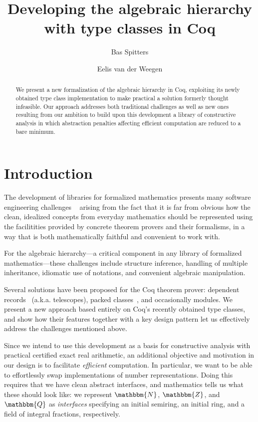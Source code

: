 \documentclass{llncs}
\newcommand{\N}{\ensuremath{\mathbbm{N}}}
\newcommand{\Z}{\ensuremath{\mathbbm{Z}}}
\newcommand{\Q}{\ensuremath{\mathbbm{Q}}}
\begin{document}
\title{Developing the algebraic hierarchy with type classes in Coq}
\author{Bas Spitters \and Eelis van der Weegen}
\maketitle
\begin{abstract}
We present a new formalization of the algebraic hierarchy in Coq, exploiting its newly obtained type class implementation to make practical a solution formerly thought infeasible. Our approach addresses both traditional challenges as well as new ones resulting from our ambition to build upon this development a library of constructive analysis in which abstraction penalties affecting efficient computation are reduced to a bare minimum.
\end{abstract}

\section{Introduction}
The development of libraries for formalized mathematics presents many software engineering challenges ~\cite{C-corn,DBLP:conf/types/HaftmannW08} arising from the fact that it is far from obvious how the clean, idealized concepts from everyday mathematics should be represented using the facilitities provided by concrete theorem provers and their formalisms, in a way that is both mathematically faithful and convenient to work with.

For the algebraic hierarchy---a critical component in any library of formalized mathematics---these challenges include structure inference, handling of multiple inheritance, idiomatic use of notations, and convenient algebraic manipulation.

Several solutions have been proposed for the Coq theorem prover: dependent records~\cite{DBLP:journals/jsc/GeuversPWZ02} (a.k.a. telescopes), packed classes~\cite{Packed}, and occasionally modules. We present a new approach based entirely on Coq's recently obtained type classes, and show how their features together with a key design pattern let us effectively address the challenges mentioned above.

Since we intend to use this development as a basis for constructive analysis with practical certified exact real arithmetic, an additional objective and motivation in our design is to facilitate \emph{efficient} computation. In particular, we want to be able to effortlessly swap implementations of number representations. Doing this requires that we have clean abstract interfaces, and mathematics tells us what these should look like: we represent $\N$, $\Z$, and $\Q$ as \emph{interfaces} specifying an initial semiring, an initial ring, and a field of integral fractions, respectively.
\end{document}
